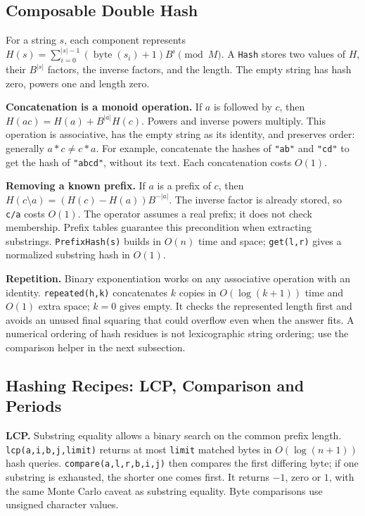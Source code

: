 \subsection{Composable Double Hash}
For a string $s$, each component represents
$H(s)=\sum_{i=0}^{|s|-1}(\operatorname{byte}(s_i)+1)B^i\pmod M$.
A \texttt{Hash} stores two values of $H$, their $B^{|s|}$ factors,
the inverse factors, and the length.
The empty string has hash zero, powers one and length zero.

\textbf{Concatenation is a monoid operation.} If $a$ is followed by
$c$, then $H(ac)=H(a)+B^{|a|}H(c)$. Powers and inverse powers multiply.
This operation is associative, has the empty string as its identity,
and preserves order: generally $a*c\ne c*a$.
For example, concatenate the hashes of \texttt{"ab"} and
\texttt{"cd"} to get the hash of \texttt{"abcd"}, without its text.
Each concatenation costs $O(1)$.

\textbf{Removing a known prefix.} If $a$ is a prefix of $c$, then
$H(c\setminus a)=(H(c)-H(a))B^{-|a|}$.
The inverse factor is already stored, so \texttt{c/a} costs $O(1)$.
The operator assumes a real prefix; it does not check membership.
Prefix tables guarantee this precondition when extracting substrings.
\texttt{PrefixHash(s)} builds in $O(n)$ time and space;
\texttt{get(l,r)} gives a normalized substring hash in $O(1)$.

\textbf{Repetition.} Binary exponentiation works on any associative
operation with an identity. \texttt{repeated(h,k)} concatenates $k$
copies in $O(\log(k+1))$ time and $O(1)$ extra space; $k=0$ gives
empty. It checks the represented length first and avoids an unused
final squaring that could overflow even when the answer fits.
A numerical ordering of hash residues is not lexicographic string
ordering; use the comparison helper in the next subsection.


\subsection{Hashing Recipes: LCP, Comparison and Periods}
\textbf{LCP.} Substring equality allows a binary search on the common
prefix length. \texttt{lcp(a,i,b,j,limit)} returns at most
\texttt{limit} matched bytes in $O(\log(n+1))$ hash queries.
\texttt{compare(a,l,r,b,i,j)} then compares the first differing byte;
if one substring is exhausted, the shorter one comes first.
It returns $-1$, zero or $1$, with the same Monte Carlo caveat as
substring equality. Byte comparisons use unsigned character values.

